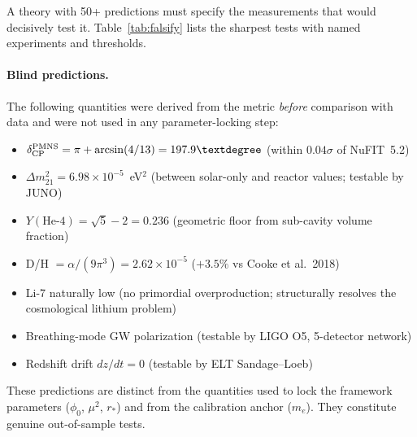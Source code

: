 \documentclass[aps,prd,twocolumn,superscriptaddress,nofootinbib,longbibliography]{revtex4-2}
\newcommand{\rstar}{r_{*}}
\newcommand{\phiz}{\phi_0}
\begin{document}
A theory with 50+ predictions must specify the measurements that
would decisively test it.  Table~\ref{tab:falsify} lists the
sharpest tests with named experiments and thresholds.

\paragraph{Blind predictions.}  The following quantities were derived
from the metric \emph{before} comparison with data and were not used
in any parameter-locking step:
\begin{itemize}
\item $\delta_{\rm CP}^{\rm PMNS} = \pi + \arcsin(4/13) = 197.9°$
  (within $0.04\sigma$ of NuFIT~5.2)
\item $\Delta m^2_{21} = 6.98 \times 10^{-5}$~eV$^2$ (between
  solar-only and reactor values; testable by JUNO)
\item $Y(\text{He-4}) = \sqrt{5}-2 = 0.236$ (geometric floor from
  sub-cavity volume fraction)
\item D/H $= \alpha/(9\pi^3) = 2.62 \times 10^{-5}$ ($+3.5\%$ vs
  Cooke et al.\ 2018)
\item Li-7 naturally low (no primordial overproduction; structurally
  resolves the cosmological lithium problem)
\item Breathing-mode GW polarization (testable by LIGO O5,
  5-detector network)
\item Redshift drift $dz/dt = 0$ (testable by ELT Sandage--Loeb)
\end{itemize}
These predictions are distinct from the quantities used to lock the
framework parameters ($\phiz$, $\mu^2$, $\rstar$) and from the
calibration anchor ($m_e$).  They constitute genuine out-of-sample
tests.
\end{document}
